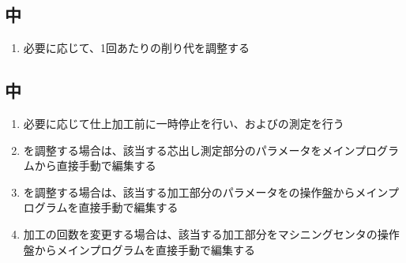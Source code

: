\subsection{\EndFacecutMilling 中}
\begin{enumerate}[label=\sarrow]
\item 必要に応じて、1回あたりの削り代を調整する
\end{enumerate}


\subsection{\OutcutMilling 中}
\begin{enumerate}[label=\sarrow]
\item 必要に応じて仕上加工前に一時停止を行い、\OutcutAsideThickness および\OutcutWidth の測定を行う
\item \OutcutAsideThickness を調整する場合は、該当する芯出し測定部分のパラメータをメインプログラムから直接手動で編集する
\item \OutcutWidth を調整する場合は、該当する加工部分のパラメータを\MMC の操作盤からメインプログラムを直接手動で編集する
\item {}加工の回数を変更する場合は、該当する加工部分をマシニングセンタの操作盤からメインプログラムを直接手動で編集する
\end{enumerate}


